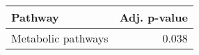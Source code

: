 \begin{tabular}{lr}
\toprule
            Pathway &  Adj. p-value \\
\midrule
 Metabolic pathways &         0.038 \\
\bottomrule
\end{tabular}
